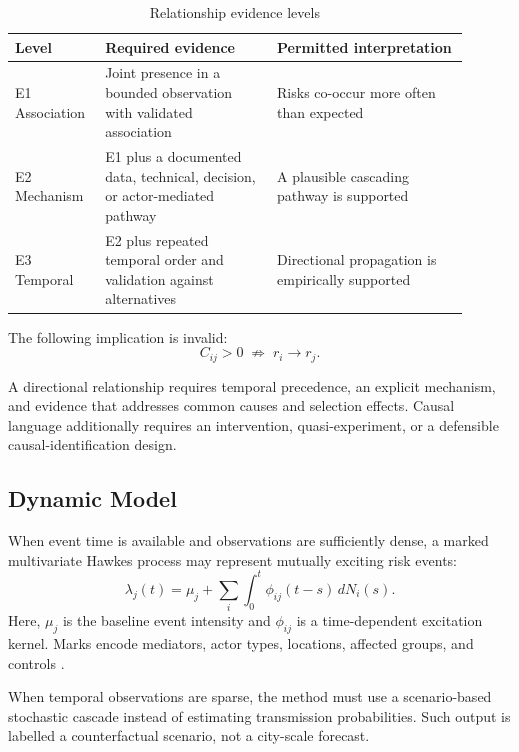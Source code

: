 \documentclass[11pt,a4paper]{article}
\begin{document}
\begin{table}[h]
\centering
\caption{Relationship evidence levels}
\begin{tabular}{p{0.16\linewidth}p{0.35\linewidth}p{0.39\linewidth}}
\toprule
Level & Required evidence & Permitted interpretation \\
\midrule
E1 Association & Joint presence in a bounded observation with validated association & Risks co-occur more often than expected \\
E2 Mechanism & E1 plus a documented data, technical, decision, or actor-mediated pathway & A plausible cascading pathway is supported \\
E3 Temporal & E2 plus repeated temporal order and validation against alternatives & Directional propagation is empirically supported \\
\bottomrule
\end{tabular}
\end{table}

The following implication is invalid:
\begin{equation}
C_{ij}>0
\;\not\Rightarrow\;
r_i \rightarrow r_j.
\end{equation}

A directional relationship requires temporal precedence, an explicit mechanism, and evidence that addresses common causes and selection effects. Causal language additionally requires an intervention, quasi-experiment, or a defensible causal-identification design.

\subsection{Dynamic Model}

When event time is available and observations are sufficiently dense, a marked multivariate Hawkes process may represent mutually exciting risk events:
\begin{equation}
\lambda_j(t)
=
\mu_j
+
\sum_i
\int_0^t
\phi_{ij}(t-s)\,dN_i(s).
\end{equation}
Here, $\mu_j$ is the baseline event intensity and $\phi_{ij}$ is a time-dependent excitation kernel. Marks encode mediators, actor types, locations, affected groups, and controls \cite{hawkes1971}.

When temporal observations are sparse, the method must use a scenario-based stochastic cascade instead of estimating transmission probabilities. Such output is labelled a counterfactual scenario, not a city-scale forecast.
\end{document}
